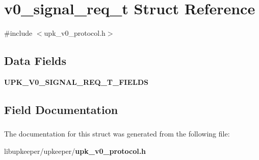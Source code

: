 \section{v0\_\-signal\_\-req\_\-t Struct Reference}
\label{structv0__signal__req__t}


{\ttfamily \#include $<$upk\_\-v0\_\-protocol.h$>$}

\subsection*{Data Fields}
\begin{DoxyCompactItemize}
\item 
{\bf UPK\_\-V0\_\-SIGNAL\_\-REQ\_\-T\_\-FIELDS}
\end{DoxyCompactItemize}


\subsection{Field Documentation}
\subsubsection[{UPK\_\-V0\_\-SIGNAL\_\-REQ\_\-T\_\-FIELDS}]{}\label{structv0__signal__req__t_a9b09f12409d89ebd4881a56c02086d48}


The documentation for this struct was generated from the following file:\begin{DoxyCompactItemize}
\item 
libupkeeper/upkeeper/{\bf upk\_\-v0\_\-protocol.h}\end{DoxyCompactItemize}
